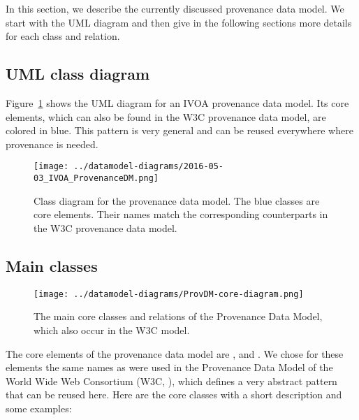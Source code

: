 In this section, we describe the currently discussed provenance data model. We 
start with the UML diagram and then give in the following sections more details 
for each class and relation.

\subsection{UML class diagram}
Figure~\ref{fig:classdiagram} shows the UML diagram for an IVOA provenance data
model. Its core elements, which can also be found in the W3C provenance data
model, are colored in blue. This pattern is very general and can be reused everywhere 
where provenance is needed. 

\begin{figure}[h]
\centering
\texttt{[image: ../datamodel-diagrams/2016-05-03\_IVOA\_ProvenanceDM.png]}
\caption{Class diagram for the provenance data model. The blue classes are core 
elements. Their names match the corresponding counterparts in the W3C provenance 
data model.}
\label{fig:classdiagram}
\end{figure}



\subsection{Main classes}\label{sec:core}

\begin{figure}[h]
\centering
\texttt{[image: ../datamodel-diagrams/ProvDM-core-diagram.png]}
\caption{The main core classes and relations of the Provenance Data Model, which also occur in the W3C model.}
\label{fig:coreclasses}
\end{figure}


The core elements of the provenance data model are ,  and . 
We chose for these elements the same names as were used in the Provenance Data 
Model of the World Wide Web Consortium (W3C, \cite{std:W3CProvDM}), which defines 
a very abstract pattern that can be reused here. Here are the core classes with 
a short description and some examples:

